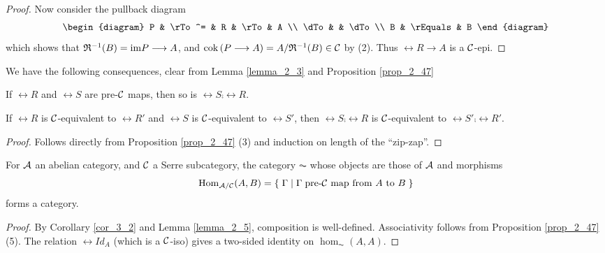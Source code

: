 \begin{proof}
Now consider the pullback diagram
\[
\begin{diagram}
P    & \rTo^=   & R    & \rTo & A \\
\dTo &          & \dTo \\
B    & \rEquals & B
\end{diagram}
\]
which shows that $\mathfrak R^{-1}(B) = \mathrm{im} P \longrightarrow A$, and $\mathrm{cok}\, (P 
\longrightarrow A) = A/\mathfrak R^{-1}(B) \in \mathcal{C}$ by (2). Thus $\rel{R} \to 
A$ is a $\mathcal{C}$-epi.
\end{proof}

We have the following consequences, clear from Lemma 
\ref{lemma_2_3} and Proposition \ref{prop_2_47}

\begin{cor}\label{cor_3_2}
If $\rel{R}$ and $\rel{S}$ are pre-$\mathcal{C}$ maps, then so is
$\rel{S} \comp \rel{R}$.
\end{cor}

\begin{lem}\label{lemma_2_5}
If $\rel{R}$ is $\mathcal{C}$-equivalent to $\rel{R}'$ and $\rel{S}$ is 
$\mathcal{C}$-equivalent to $\rel{S}'$, then $\rel{S} \comp \rel{R}$ is
$\mathcal{C}$-equivalent to $\rel{S}' \comp \rel{R}'$.
\end{lem}
\begin{proof}
Follows directly from Proposition \ref{prop_2_47} (3) and induction
on length of the ``zip-zap''.
\end{proof}

\begin{prop}
For $\mathcal{A}$ an abelian category, and $\mathcal{C}$ a Serre 
subcategory, the category $\AC$ whose objects are those of 
$\mathcal{A}$ and morphisms
\[
\mathrm{Hom}_{\mathcal{A}/\mathcal{C}}(A, B) = \{\; \Gamma\; |\; \Gamma\;
\textrm{pre-}\mathcal{C}\textrm{ map from }A\textrm{ to }B \;\}
\] 
forms a category.
\end{prop}
\begin{proof}
By Corollary \ref{cor_3_2} and Lemma \ref{lemma_2_5}, composition 
is well-defined. Associativity follows from Proposition 
\ref{prop_2_47} (5). The relation $\rel{Id}_A$ (which is a 
$\mathcal{C}$-iso) gives a two-sided identity on $\hom_{\AC}(A, A)$.
\end{proof}
